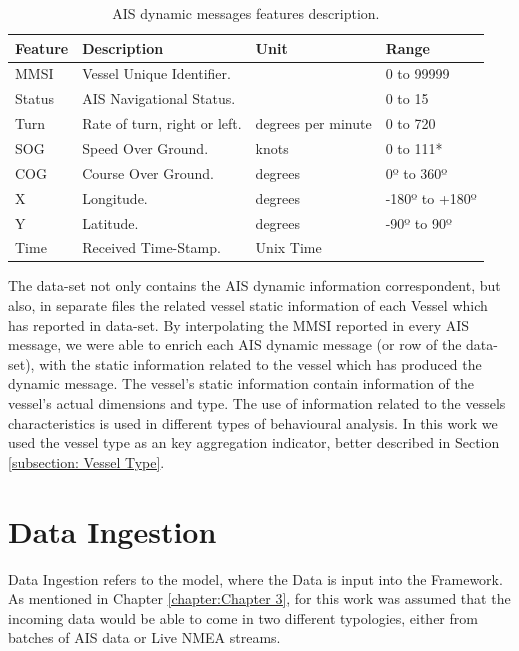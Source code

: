 \begin{table}[H]
\centering
\caption{AIS dynamic messages features description.}
\label{Table: Data-Set Features}
\begin{tabular}{@{}llll@{}}
\toprule
Feature & Description                  & Unit               & Range          \\ \midrule
MMSI    & Vessel Unique Identifier.     &                    & 0 to 99999     \\
Status  & AIS Navigational Status.     &                    & 0 to 15        \\
Turn    & Rate of turn, right or left. & degrees per minute & 0 to 720       \\
SOG     & Speed Over Ground.           & knots              & 0 to 111*      \\
COG     & Course Over Ground.          & degrees            & 0º to 360º     \\
X       & Longitude.                   & degrees            & -180º to +180º \\
Y       & Latitude.                    & degrees            & -90º to 90º    \\
Time    & Received Time-Stamp.         & Unix Time          &                \\ \bottomrule
\end{tabular}
\end{table}

The data-set not only contains the AIS dynamic information correspondent, but also, in separate files the related vessel static information of each Vessel which has reported in data-set. By interpolating the MMSI reported in every AIS message, we were able to enrich each AIS dynamic message (or row of the data-set), with the static information related to the vessel which has produced the dynamic message. The vessel's static information contain information of the vessel's actual dimensions and type. The use of information related to the vessels characteristics is used in different types of behavioural analysis. In this work we used the vessel type as an key aggregation indicator, better described in Section \ref{subsection: Vessel Type}.

\section{Data Ingestion}
\todo[inline]{}
Data Ingestion refers to the model, where the Data is input into the Framework. As mentioned in Chapter \ref{chapter:Chapter 3}, for this work was assumed that the incoming data would be able to come in two different typologies, either from batches of AIS data or Live NMEA streams. 

